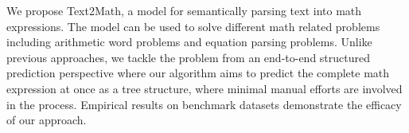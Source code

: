 We propose Text2Math, a model for semantically parsing text into math expressions.
The model can be used to solve different math related problems including arithmetic word problems and equation parsing problems.
Unlike previous approaches, we tackle the problem from an end-to-end structured prediction perspective where our algorithm aims to predict the complete math expression at once as a tree structure, where minimal manual efforts are involved in the process.
Empirical results on benchmark datasets demonstrate the efficacy of our approach.